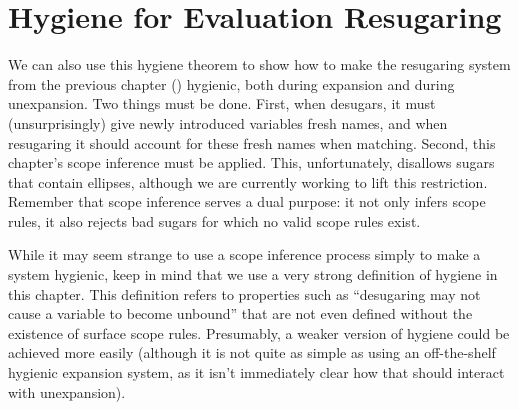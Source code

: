 \section{Hygiene for Evaluation Resugaring}
\label{sec:rscope-eval-hygiene}

We can also use this hygiene theorem to show how to make the
resugaring system from the previous chapter (\Resugarer) hygienic,
both during expansion and during unexpansion. Two things must be
done. First, when {\Resugarer} desugars, it must (unsurprisingly) give
newly introduced variables fresh names, and when resugaring it should
account for these fresh names when matching. Second, this chapter's scope
inference must be applied. This, unfortunately, disallows sugars that
contain ellipses, although we are currently working to lift this
restriction. Remember that scope inference serves a dual %
purpose: it not only infers scope rules, it also rejects bad sugars
for which no valid scope rules exist.

While it may seem strange to use a scope inference process simply to
make a system hygienic, keep in mind that we use a very strong
definition of hygiene in this chapter. This definition refers to
properties such as ``desugaring may not cause a variable to become
unbound'' that are not even defined without the existence of surface
scope rules. Presumably, a weaker version of hygiene could be
achieved more easily (although it is not quite as simple as using an
off-the-shelf hygienic expansion system, as it isn't immediately clear
how that should interact with unexpansion).

